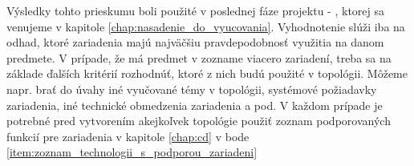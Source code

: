 Výsledky tohto prieskumu boli použité v poslednej fáze projektu - , ktorej sa venujeme v kapitole \ref{chap:nasadenie_do_vyucovania}. Vyhodnotenie slúži iba na odhad, ktoré zariadenia majú najväčšiu pravdepodobnosť využitia na danom predmete. V prípade, že má predmet v zozname viacero zariadení, treba sa na základe ďalších kritérií rozhodnúť, ktoré z nich budú použité v topológii. Môžeme napr. brať do úvahy iné vyučované témy v topológii, systémové požiadavky zariadenia, iné technické obmedzenia zariadenia a pod. V každom prípade je potrebné pred vytvorením akejkoľvek topológie použiť zoznam podporovaných funkcií pre zariadenia v kapitole \ref{chap:cd} v bode \ref{item:zoznam_technologii_s_podporou_zariadeni} 